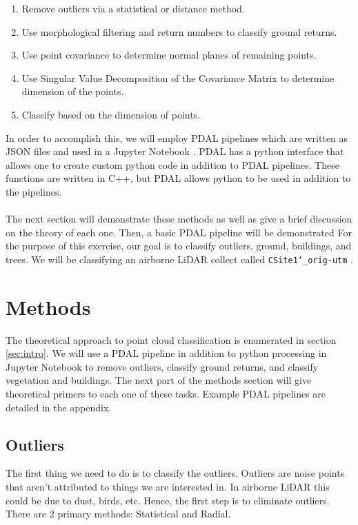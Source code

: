 \documentclass[11pt]{article}
\theoremstyle{definition}
\begin{document}
	\begin{enumerate}  
	\item Remove outliers via a statistical or distance method.
	\item Use morphological filtering and return numbers to classify ground returns.
	\item Use point covariance to determine normal planes of remaining points.
	\item Use Singular Value Decomposition of the Covariance Matrix to determine dimension of the points.
	\item Classify based on the dimension of points.
\end{enumerate}
In order to accomplish this, we will employ PDAL pipelines which are written as JSON files and used in a Jupyter Notebook  \cite{pdal}.  PDAL has a python interface that allows one to create custom python code in addition to PDAL pipelines.  These functions are written in C++, but PDAL allows python to be used in addition to the pipelines.
\\\\
The next section will demonstrate these methods as well as give a brief discussion on the theory of each one.  Then, a basic PDAL pipeline will be demonstrated  For the purpose of this exercise, our goal is to classify outliers, ground, buildings, and trees. We will be classifying an airborne LiDAR collect called \texttt{CSite1\char`_orig-utm} \cite{pdal}. 

\section{Methods}\label{methods}
The theoretical approach to point cloud classification is enumerated in section \ref{sec:intro}.  We will use a PDAL pipeline in addition to python processing in Jupyter Notebook to remove outliers, classify ground returns, and classify vegetation and buildings.  The next part of the methods section will give theoretical primers to each one of these tasks.  Example PDAL pipelines are detailed in the appendix.  
\subsection{Outliers}\label{sub:outliers}
The first thing we need to do is to classify the outliers.  Outliers are noise points that aren't attributed to things we are interested in.  In airborne LiDAR this could be due to dust, birds, etc.  Hence, the first step is to eliminate outliers.  There are 2 primary methods: Statistical and Radial.
\end{document}

